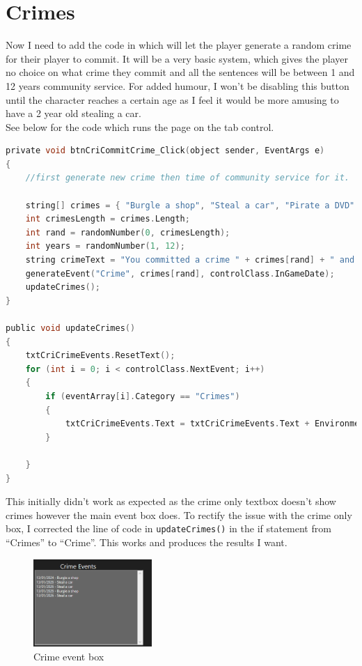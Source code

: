 \section{Crimes}
Now I need to add the code in which will let the player generate a random crime for their player to commit. It will be a very basic system, which gives the player no choice on what crime they commit and all the sentences will be between 1 and 12 years community service. For added humour, I won't be disabling this button until the character reaches a certain age as I feel it would be more amusing to have a 2 year old stealing a car.\\
See below for the code which runs the page on the tab control.
\begin{lstlisting}[language=c, style=csharp, caption=Procuedres which are run when the "Comit Random Crime" button is pressed]
private void btnCriCommitCrime_Click(object sender, EventArgs e)
{
    //first generate new crime then time of community service for it. 

    string[] crimes = { "Burgle a shop", "Steal a car", "Pirate a DVD" };
    int crimesLength = crimes.Length;
    int rand = randomNumber(0, crimesLength);
    int years = randomNumber(1, 12);
    string crimeText = "You committed a crime " + crimes[rand] + " and you recieved " + years.ToString() + " years community service.";
    generateEvent("Crime", crimes[rand], controlClass.InGameDate);
    updateCrimes();
}

public void updateCrimes()
{
    txtCriCrimeEvents.ResetText();
    for (int i = 0; i < controlClass.NextEvent; i++)
    {
        if (eventArray[i].Category == "Crimes")
        {
            txtCriCrimeEvents.Text = txtCriCrimeEvents.Text + Environment.NewLine + eventArray[i].DateHappened.ToShortDateString() + " - " + eventArray[i].Description;
        }

    }
}
\end{lstlisting}
This initially didn't work as expected as the crime only textbox doesn't show crimes however the main event box does. To rectify the issue with the crime only box, I corrected the line of code in \verb|updateCrimes()| in the if statement from “Crimes” to “Crime”. This works and produces the results I want.
\begin{figure}[H]
    \centering
    \includegraphics[width=0.4\textwidth]{images/implementation/crime1.png}
    \caption{Crime event box}
    \label{fig:implementation-crime1}
\end{figure}

